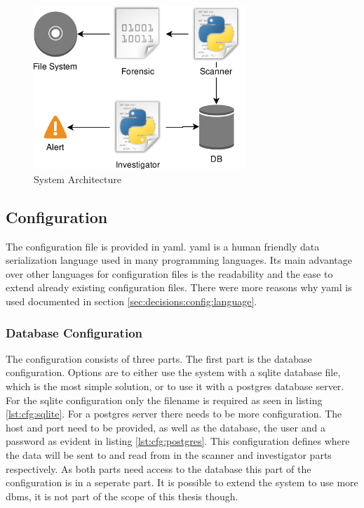 \begin{figure}[ht]
  \includegraphics[width=8cm]{../img/Overview_FIDS.png}
  \centering
  \caption{System Architecture}
  \label{fig:systemArchitecture}
\end{figure}

\subsection{Configuration}
\label{sec:Configuration}

The configuration file is provided in \gls{yaml}. \gls{yaml} is a human friendly data serialization language used in many programming languages. Its main advantage over other languages for configuration files is the readability and the ease to extend already existing configuration files. There were more reasons why \gls{yaml} is used documented in section \ref{sec:decisions:config:language}.

\subsubsection{Database Configuration}

The configuration consists of three parts. The first part is the database configuration. Options are to either use the system with a \gls{sqlite} database file, which is the most simple solution, or to use it with a \gls{postgres} database server. For the sqlite configuration only the filename is required as seen in listing \ref{lst:cfg:sqlite}. For a postgres server there needs to be more configuration. The host and port need to be provided, as well as the database, the user and a password as evident in listing \ref{lst:cfg:postgres}. This configuration defines where the data will be sent to and read from in the scanner and investigator parts respectively. As both parts need access to the database this part of the configuration is in a seperate part. It is possible to extend the system to use more \gls{dbms}, it is not part of the scope of this thesis though.


